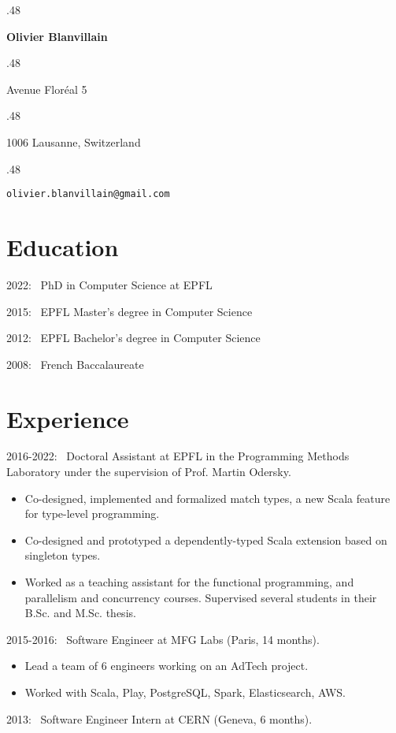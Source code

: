 \documentclass[marginmode, 11pt]{res}
\newcommand{\centered}[1]{\moveleft.48\hoffset\centerline{#1}}
\renewcommand{\:}[0]{:~}
\begin{document}
\centered{\LARGE\textbf{Olivier Blanvillain}}
\vspace{10pt}

\centered{Avenue Floréal 5}
\centered{1006 Lausanne, Switzerland}
\vspace{3pt}
\vspace{2pt}
\centered{\texttt{olivier.blanvillain@gmail.com}}

\begin{resume}

\section{Education}

2022\: PhD in Computer Science at EPFL

2015\: EPFL Master's degree in Computer Science

2012\: EPFL Bachelor's degree in Computer Science

2008\: French Baccalaureate

\section{Experience}

2016-2022\: Doctoral Assistant at EPFL in the Programming Methods Laboratory under the supervision of Prof. Martin Odersky.

\begin{itemize}
  \item Co-designed, implemented and formalized match types, a new Scala feature for type-level programming.
  \item Co-designed and prototyped a dependently-typed Scala extension based on singleton types.
  \item Worked as a teaching assistant for the functional programming, and parallelism and concurrency courses. Supervised several students in their B.Sc. and M.Sc. thesis.
\end{itemize}

2015-2016\: Software Engineer at MFG Labs (Paris, 14 months).

\begin{itemize}
  \item Lead a team of 6 engineers working on an AdTech project.
  \item Worked with Scala, Play, PostgreSQL, Spark, Elasticsearch, AWS.
\end{itemize}

2013\: Software Engineer Intern at CERN (Geneva, 6 months).


\end{resume}
\end{document}
